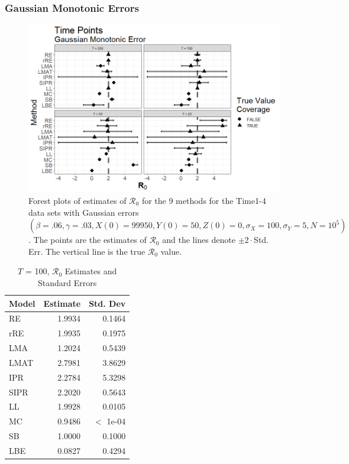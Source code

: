 \documentclass[12pt]{article}
\newcommand{\xxsir}{\ensuremath{9} } %
\newcommand{\rr}{\ensuremath{\mathcal{R}_0}}
\begin{document}
\subsubsection{Gaussian Monotonic Errors}
\begin{figure}[H]
	\centering
	\includegraphics[scale=0.5]{images/time_nm.tiff}
	\caption{Forest plots of estimates of $\rr$ for the \xxsir methods for the Time1-4 data sets with Gaussian errors $(\beta=.06, \gamma=.03, X(0)=99950, Y(0)=50, Z(0)=0, \sigma_X=100, \sigma_Y=5, N=10^5)$.  The points are the estimates of $\rr$ and the lines denote $\pm 2\cdot $Std. Err.  The vertical line is the true $\rr$ value.}
\end{figure}

\begin{table}[H]
	
	
	\centering
	\begin{tabular}[t]{l|r|r}
		\hline
		Model & Estimate & Std. Dev\\
		\hline
		RE & 1.9934 & 0.1464\\
		\hline
		rRE & 1.9935 & 0.1975\\
		\hline
		LMA & 1.2024 & 0.5439\\
		\hline
		LMAT & 2.7981 & 3.8629\\
		\hline
		IPR & 2.2784 & 5.3298\\
		\hline
		SIPR & 2.2020 & 0.5643\\
		\hline
		LL & 1.9928 & 0.0105\\
		\hline
		MC & 0.9486 & $<$ 1e-04\\
		\hline
		SB & 1.0000 & 0.1000\\
		\hline
		LBE & 0.0827 & 0.4294 \\
		\hline
	\end{tabular}
	\caption{ $T$ = 100, $\rr$ Estimates and Standard Errors}
\end{table}
\end{document}

